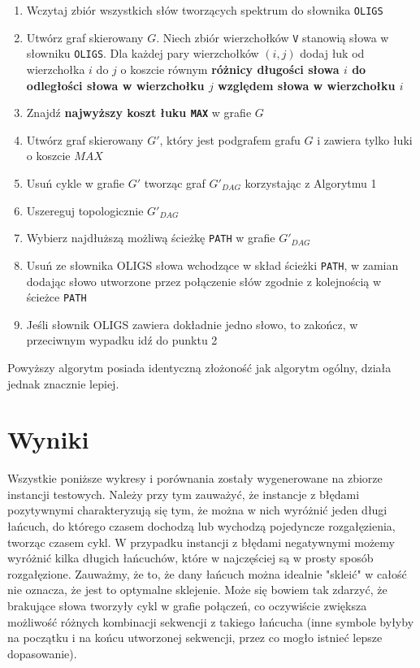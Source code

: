 \documentclass[a4paper,10pt]{article}
\begin{document}
\begin{enumerate}
 \item Wczytaj zbiór wszystkich słów tworzących spektrum do słownika \texttt{OLIGS}
 \item Utwórz graf skierowany $G$. Niech zbiór wierzchołków \texttt{V} stanowią słowa w słowniku \texttt{OLIGS}. 
       Dla każdej pary wierzchołków $(i,j)$ dodaj łuk od wierzchołka $i$ do $j$ o koszcie równym 
       {\bf różnicy długości słowa $i$ do odległości słowa w wierzchołku $j$ względem słowa w wierzchołku $i$}
 \item Znajdź {\bf najwyższy koszt łuku \texttt{MAX}} w grafie $G$
 \item Utwórz graf skierowany $G'$, który jest podgrafem grafu $G$ i zawiera tylko łuki o koszcie $MAX$
 \item Usuń cykle w grafie $G'$ tworząc graf $G'_{DAG}$ korzystając z Algorytmu 1
 \item Uszereguj topologicznie $G'_{DAG}$
 \item Wybierz najdłuższą możliwą ścieżkę \texttt{PATH} w grafie $G'_{DAG}$
 \item Usuń ze słownika OLIGS słowa wchodzące w skład ścieżki \texttt{PATH}, w zamian dodając słowo utworzone przez połączenie słów zgodnie z kolejnością w ścieżce \texttt{PATH}
 \item Jeśli słownik OLIGS zawiera dokładnie jedno słowo, to zakończ, w przeciwnym wypadku idź do punktu 2
\end{enumerate}

Powyższy algorytm posiada identyczną złożoność jak algorytm ogólny, działa jednak znacznie lepiej.

\section{Wyniki}

Wszystkie poniższe wykresy i porównania zostały wygenerowane na zbiorze instancji testowych. Należy przy tym zauważyć, że instancje z błędami pozytywnymi charakteryzują się tym, że można w nich wyróżnić jeden długi łańcuch, do którego czasem dochodzą lub wychodzą pojedyncze rozgałęzienia, tworząc czasem cykl. W przypadku instancji z błędami negatywnymi możemy wyróżnić kilka długich łańcuchów, które w najczęściej są w prosty sposób rozgałęzione. Zauważmy, że to, że dany łańcuch można idealnie "skleić" w całość nie oznacza, że jest to optymalne sklejenie. Może się bowiem tak zdarzyć, że brakujące słowa tworzyły cykl w grafie połączeń, co oczywiście zwiększa możliwość różnych kombinacji sekwencji z takiego łańcucha (inne symbole byłyby na początku i na końcu utworzonej sekwencji, przez co mogło istnieć lepsze dopasowanie).
\end{document}
